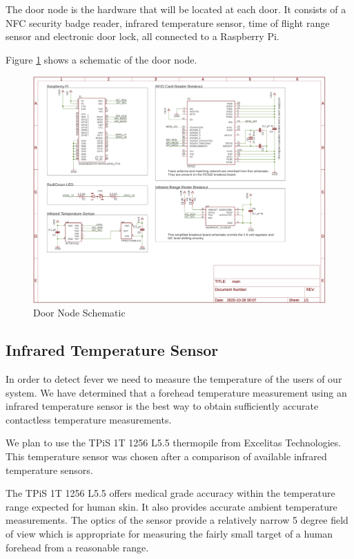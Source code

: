 The door node is the hardware that will be located at each door. It consists of
a NFC security badge reader, infrared temperature sensor, time of flight range
sensor and electronic door lock, all connected to a Raspberry Pi.

Figure \ref{fig:door-node-schematic} shows a schematic of the door node.

\begin{figure}[!htb]
\centering
\includegraphics[width=\textwidth]{images/door-node-schematic.png}
\caption{Door Node Schematic}
\label{fig:door-node-schematic}
\end{figure}

\subsection{Infrared Temperature Sensor}

In order to detect fever we need to measure the temperature of the users of our
system. We have determined that a forehead temperature measurement using an
infrared temperature sensor is the best way to obtain sufficiently accurate
contactless temperature measurements.

We plan to use the TPiS 1T 1256 L5.5 thermopile from Excelitas Technologies.
This temperature sensor was chosen after a comparison of available infrared
temperature sensors.

The TPiS 1T 1256 L5.5 offers medical grade accuracy within the temperature range
expected for human skin. It also provides accurate ambient temperature
measurements. The optics of the sensor provide a relatively narrow 5 degree field
of view which is appropriate for measuring the fairly small target of a human
forehead from a reasonable range.

